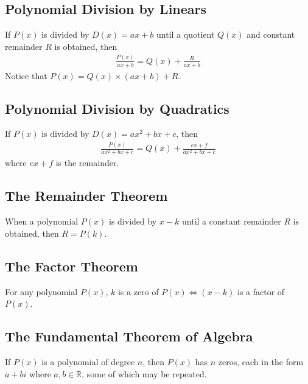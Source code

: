 \documentclass[10pt, a4paper, titlepage]{article}
\newcommand{\mbb}[1]{\mathbb{#1}}
\begin{document}
\begin{multicols*}{3}
	\dotfill
	\subsection{Polynomial Division by Linears}
	If $P(x)$ is divided by $D(x)=ax+b$ until a quotient $Q(x)$ and constant remainder $R$ is obtained, then
	\begin{align}
		\frac{P(x)}{ax+b}=Q(x)+\frac{R}{ax+b}
	\end{align}
	Notice that $P(x)=Q(x)\times (ax+b)+R$.
	
	\dotfill
	\subsection{Polynomial Division by Quadratics}
	If $P(x)$ is divided by $D(x)=ax^2+bx+c$, then
	\begin{align}
		\frac{P(x)}{ax^2+bx+c}=Q(x)+\frac{ex+f}{ax^2+bx+c}
	\end{align}
	where $ex+f$ is the remainder.
	
	\dotfill
	\subsection{The Remainder Theorem}
	When a polynomial $P(x)$ is divided by $x-k$ until a constant remainder $R$ is obtained, then $R=P(k)$.
	
	\dotfill
	\subsection{The Factor Theorem}
	For any polynomial $P(x)$, $k$ is a zero of $P(x)\iff (x-k)$ is a factor of $P(x)$.
	
	\dotfill
	\subsection{The Fundamental Theorem of Algebra}
	If $P(x)$ is a polynomial of degree $n$, then $P(x)$ has $n$ zeros, each in the form $a+bi$ where $a,b\in \mbb{R}$, some of which may be repeated.
	

	\hrulefill


\end{multicols*}
\end{document}
